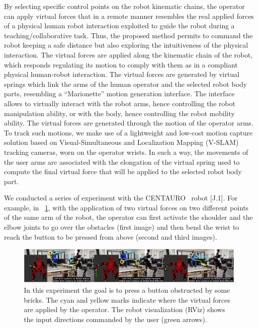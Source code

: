 By selecting specific control points on the robot kinematic chains, the operator can apply virtual forces that in a remote manner resembles the real applied forces of a physical human robot interaction exploited to guide the robot during a teaching/collaborative task. Thus, the proposed method permits to command the robot keeping a safe distance but also exploring the intuitiveness of the physical interaction. 
%
%
The virtual forces are applied along the kinematic chain of the robot, which responds regulating its motion to comply with them as in a compliant physical human-robot interaction. The virtual forces are generated by virtual springs which link the arms of the human operator and the selected robot body parts, resembling a \enquote{Marionette} motion generation interface. The interface allows to virtually interact with the robot arms, hence controlling the robot manipulation ability, or with the body, hence controlling the robot mobility ability.
%
The virtual forces are generated through the motion of the operator arms. To track such motions, we make use of a lightweight and low-cost motion capture solution based on Visual-Simultaneous and Localization Mapping (V-SLAM) tracking cameras, worn on the operator wrists. In such a way, the movements of the user arms are associated with the elongation of the virtual spring used to compute the final virtual force that will be applied to the selected robot body part.

We conducted a series of experiment with the CENTAURO~\cite{Centauro2} robot [J.1]. For example, in \figurename~\ref{fig:tpoexp}, with the application of two virtual forces on two different points of the same arm of the robot, the operator can first activate the shoulder and the elbow joints to go over the obstacles (first image) and then bend the wrist to reach the button to be pressed from above (second and third images).   

\begin{figure}[H]
	\centering
	\includegraphics[width=0.95\linewidth]{img/tpoExp}
	\caption{In this experiment the goal is to press a button obstructed by some bricks. The cyan and yellow marks indicate where the virtual forces are applied by the operator. The robot visualization (RViz) shows the input directions commanded by the user (green arrows).}
	\label{fig:tpoexp}
\end{figure}



